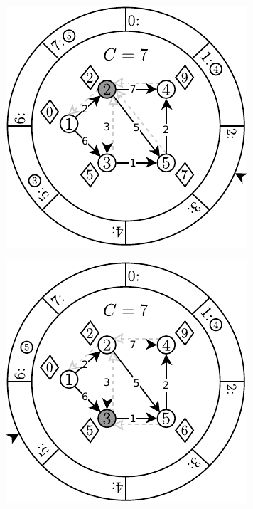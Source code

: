 \begin{figure}[!htbp]
\begin{subfigure}[b]{0.3\textwidth}
		\caption{}
	\end{subfigure}
	\qquad
	\begin{subfigure}[b]{0.3\textwidth}
		\includegraphics[width=\textwidth]{Chapter_II/DIAL-Example/c.pdf}
		\caption{}
	\end{subfigure}
	\qquad
	\begin{subfigure}[b]{0.3\textwidth}
		\includegraphics[width=\textwidth]{Chapter_II/DIAL-Example/d.pdf}

\end{subfigure}
\end{figure}

